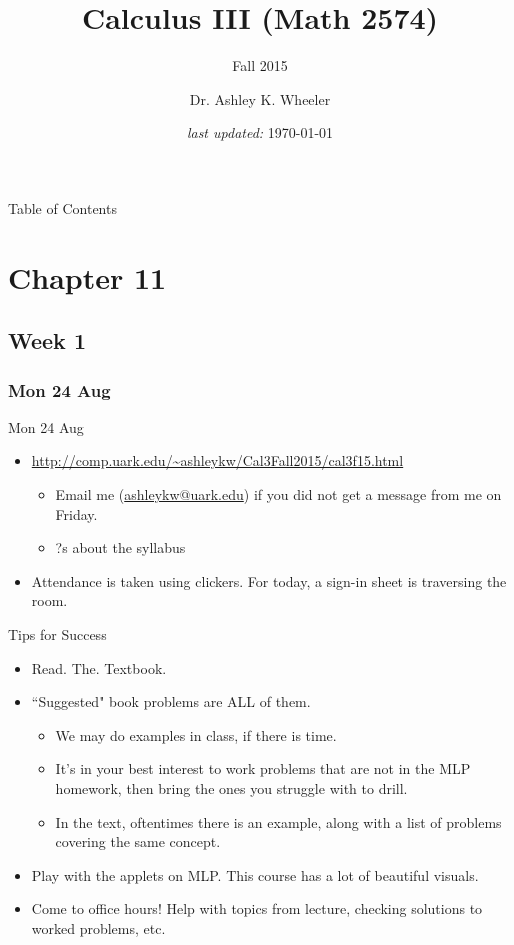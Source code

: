 \documentclass[12pt]{beamer}
\title[Cal III Fall 2015]{Calculus III (Math 2574)}
\subtitle{Fall 2015}
\author[Wheeler]{\footnotesize Dr. Ashley K. Wheeler}
\institute{University of Arkansas}
\date{\footnotesize{\it last updated:} \today}
\theoremstyle{plain}
\theoremstyle{definition}
\begin{document}
\frame{\titlepage}

\begin{frame}[allowframebreaks=1.00]{Table of Contents}
\begin{multicols}{3}
\tableofcontents
\end{multicols}
\end{frame}

\section{Chapter 11}
\subsection{Week 1}
\subsubsection{Mon 24 Aug}
\begin{frame}{Mon 24 Aug}
\begin{itemize}
\item \url{http://comp.uark.edu/~ashleykw/Cal3Fall2015/cal3f15.html}
	\begin{itemize}
	\item Email me (\url{ashleykw@uark.edu}) if you did not get a message from me on Friday.
	\item ?s about the syllabus
	\end{itemize}
\item Attendance is taken using clickers.  For today, a sign-in sheet is traversing the room.  
\end{itemize}
\end{frame}

\begin{frame}{\small Tips for Success}
\begin{itemize}
\item Read. The. Textbook.
\item ``Suggested" book problems are ALL of them.  
	\begin{itemize}
	\item We may do examples in class, if there is time.  
	\item It's in your best interest to work problems that are \alert{not} in the MLP homework, then bring the ones you struggle with to drill.
	\item In the text, oftentimes there is an example, along with a list of problems covering the same concept.
	\end{itemize}
\item Play with the applets on MLP.  This course has a lot of beautiful visuals.
\item Come to office hours!  Help with topics from lecture, checking solutions to worked problems, etc.
\end{itemize}
\end{frame}
\end{document}

